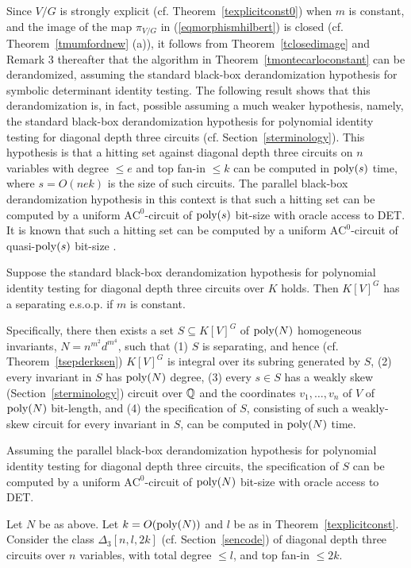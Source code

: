 \documentclass[11pt]{article}
\begin{document}
Since $V/G$ is strongly explicit (cf. Theorem~\ref{texplicitconst0})  when $m$  is constant, 
and the image of the map $\pi_{V/G}$ in (\ref{eqmorphismhilbert}) is closed (cf. Theorem~\ref{tmumfordnew} (a)),
it follows from Theorem~\ref{tclosedimage} and Remark 3 thereafter  that 
the algorithm in Theorem~\ref{tmontecarloconstant} can be derandomized, assuming the 
standard  black-box derandomization hypothesis for symbolic determinant identity testing.
The following  result shows that this derandomization is, in fact, possible assuming a much weaker hypothesis,
namely, the standard  black-box derandomization hypothesis for polynomial identity testing for diagonal depth three circuits (cf. Section~\ref{sterminology}).
This  hypothesis is that a hitting set 
against  diagonal depth three circuits on $n$ variables with degree $\le e$ and top fan-in $\le k$ can be computed in ${\mbox {poly}}(s)$ time,
where $s=O(n e k)$ is the size of such circuits.
The  parallel black-box derandomization hypothesis in this context 
is that such a hitting set can be computed by a uniform  $\mbox{AC}^0$-circuit of 
${\mbox {poly}}(s)$ bit-size with oracle access to DET. It is known that such a hitting set can be computed by a uniform $\mbox{AC}^0$-circuit of 
quasi-${\mbox {poly}}(s)$ bit-size \cite{manindra}.

\begin{theorem} \label{thilbertmainblack}
Suppose  the standard black-box derandomization hypothesis for   polynomial identity testing for  diagonal depth three circuits over $K$ 
holds. Then $K[V]^G$ has a separating  e.s.o.p. if $m$ is constant.

Specifically, there  then exists a set $S \subseteq K[V]^G$ of ${\mbox {poly}}(N)$ homogeneous invariants,
$N=n^{m^2} d^{m^4}$, such that  (1) $S$ is separating, and hence (cf. Theorem~\ref{tsepderksen}) 
$K[V]^G$ is integral over its subring generated by $S$, (2) every invariant in $S$ has   ${\mbox {poly}}(N)$ degree, (3) 
every $s \in S$ has a weakly skew (Section~\ref{sterminology}) circuit 
over $\mathbb{Q}$ and the coordinates $v_1,\ldots,v_n$ of $V$ 
of ${\mbox {poly}}(N)$ bit-length, and (4)
the specification of $S$, consisting of such a  weakly-skew  circuit for  every
invariant in $S$, can be computed in ${\mbox {poly}}(N)$ time. 

Assuming the parallel black-box derandomization hypothesis for  polynomial identity testing for  diagonal  depth three circuits, the 
specification of  $S$ can  be computed by a uniform  $\mbox{AC}^0$-circuit of ${\mbox {poly}}(N)$ bit-size with oracle access to DET.
\end{theorem} 
\proof
Let $N$ be as above. Let $k=O({\mbox {poly}}(N))$ and $l$ be  as in Theorem~\ref{texplicitconst}.
Consider  the class $\Delta_3[n,l,2 k]$ (cf. Section~\ref{sencode}) 
of diagonal depth three circuits over $n$ variables, with total degree $\le l$, and top fan-in
$\le 2 k$.
\end{document}
